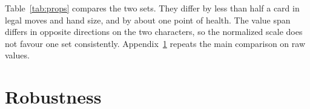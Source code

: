 \begin{table}[h]
\centering
\footnotesize
\setlength{\tabcolsep}{3pt}
\caption{Mean properties of the 440 states in each set. Each set draws 75 to 100 states from each of the five encounters.}
\label{tab:props}
\end{table}

Table~\ref{tab:props} compares the two sets. They differ by less than half a card in legal moves and hand size, and by about one point of health. The value span differs in opposite directions on the two characters, so the normalized scale does not favour one set consistently. Appendix~\ref{app:robust} repeats the main comparison on raw values.

\section{Robustness}
\label{app:robust}

